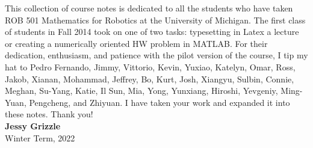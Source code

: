 
This collection of course notes is dedicated to all the students who have taken ROB 501 Mathematics for Robotics at the University of Michigan. The first class of students in Fall 2014 took on one of two tasks: typesetting in Latex a lecture or creating a numerically oriented HW problem in MATLAB. For their dedication, enthusiasm, and patience with the pilot version of the course, I tip my hat to Pedro Fernando, Jimmy, Vittorio, Kevin, Yuxiao, Katelyn, Omar, Ross, Jakob, Xianan, Mohammad, Jeffrey, Bo, Kurt, Josh, Xiangyu, Sulbin, Connie, Meghan, Su-Yang, Katie, Il Sun, Mia, Yong, Yunxiang, Hiroshi, Yevgeniy, Ming-Yuan, Pengcheng, and Zhiyuan. I have taken your work and expanded it into these notes. Thank you!\\

\textbf{Jessy Grizzle}\\
Winter Term, 2022